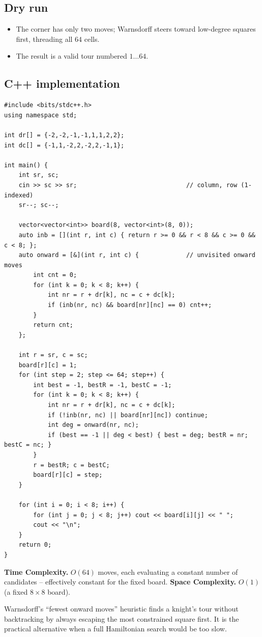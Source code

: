 \subsection*{Dry run}


\begin{itemize}
  \item The corner has only two moves; Warnsdorff steers toward low-degree
        squares first, threading all $64$ cells.
  \item The result is a valid tour numbered $1\ldots64$.
\end{itemize}

\subsection*{C++ implementation}

\begin{lstlisting}
#include <bits/stdc++.h>
using namespace std;

int dr[] = {-2,-2,-1,-1,1,1,2,2};
int dc[] = {-1,1,-2,2,-2,2,-1,1};

int main() {
    int sr, sc;
    cin >> sc >> sr;                              // column, row (1-indexed)
    sr--; sc--;

    vector<vector<int>> board(8, vector<int>(8, 0));
    auto inb = [](int r, int c) { return r >= 0 && r < 8 && c >= 0 && c < 8; };
    auto onward = [&](int r, int c) {             // unvisited onward moves
        int cnt = 0;
        for (int k = 0; k < 8; k++) {
            int nr = r + dr[k], nc = c + dc[k];
            if (inb(nr, nc) && board[nr][nc] == 0) cnt++;
        }
        return cnt;
    };

    int r = sr, c = sc;
    board[r][c] = 1;
    for (int step = 2; step <= 64; step++) {
        int best = -1, bestR = -1, bestC = -1;
        for (int k = 0; k < 8; k++) {
            int nr = r + dr[k], nc = c + dc[k];
            if (!inb(nr, nc) || board[nr][nc]) continue;
            int deg = onward(nr, nc);
            if (best == -1 || deg < best) { best = deg; bestR = nr; bestC = nc; }
        }
        r = bestR; c = bestC;
        board[r][c] = step;
    }

    for (int i = 0; i < 8; i++) {
        for (int j = 0; j < 8; j++) cout << board[i][j] << " ";
        cout << "\n";
    }
    return 0;
}
\end{lstlisting}

\begin{complexitybox}
\textbf{Time Complexity.} $O(64)$ moves, each evaluating a constant number
of candidates -- effectively constant for the fixed board. \textbf{Space
Complexity.} $O(1)$ (a fixed $8\times8$ board).
\end{complexitybox}

\begin{takeawaybox}
Warnsdorff's ``fewest onward moves'' heuristic finds a knight's tour without
backtracking by always escaping the most constrained square first. It is the
practical alternative when a full Hamiltonian search would be too slow.
\end{takeawaybox}
